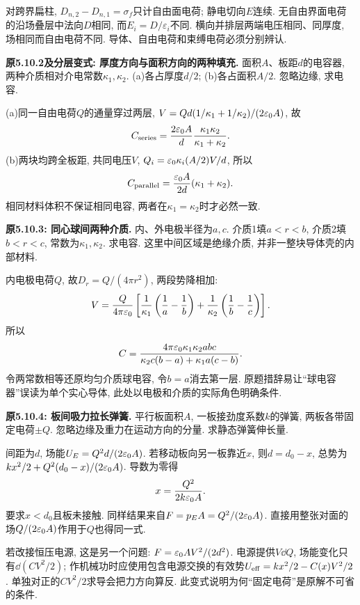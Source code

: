 对跨界扁柱, $D_{n,2}-D_{n,1}=\sigma_f$只计自由面电荷; 静电切向$E$连续. 无自由界面电荷的沿场叠层中法向$D$相同, 而$E_i=D/\varepsilon_i$不同. 横向并排层两端电压相同、同厚度, 场相同而自由电荷不同. 导体、自由电荷和束缚电荷必须分别辨认.

\begin{example}
\textbf{原5.10.2及分层变式: 厚度方向与面积方向的两种填充.} 
面积$A$、板距$d$的电容器, 两种介质相对介电常数$\kappa_1,\kappa_2$. (a)各占厚度$d/2$; (b)各占面积$A/2$. 忽略边缘, 求电容.
\end{example}
\begin{solution}
(a)同一自由电荷$Q$的通量穿过两层, $V=Qd(1/\kappa_1+1/\kappa_2)/(2\varepsilon_0 A)$, 故
\[C_{\rm series}=\frac{2\varepsilon_0 A}{d}\frac{\kappa_1\kappa_2}{\kappa_1+\kappa_2}.\]
(b)两块均跨全板距, 共同电压$V$, $Q_i=\varepsilon_0\kappa_i(A/2)V/d$, 所以
\[C_{\rm parallel}=\frac{\varepsilon_0 A}{2d}(\kappa_1+\kappa_2).\]
相同材料体积不保证相同电容, 两者在$\kappa_1=\kappa_2$时才必然一致.
\end{solution}

\begin{example}
\textbf{原5.10.3: 同心球间两种介质.} 
内、外电极半径为$a,c$. 介质1填$a<r<b$, 介质2填$b<r<c$, 常数为$\kappa_1,\kappa_2$. 求电容. 这里中间区域是绝缘介质, 并非一整块导体壳的内部材料.
\end{example}
\begin{solution}
内电极电荷$Q$, 故$D_r=Q/(4\pi r^2)$, 两段势降相加:
\[V=\frac Q{4\pi\varepsilon_0}\left[\frac1{\kappa_1}\left(\frac1a-\frac1b\right)+\frac1{\kappa_2}\left(\frac1b-\frac1c\right)\right].\]
所以
\[C=\frac{4\pi\varepsilon_0\kappa_1\kappa_2abc}{\kappa_2c(b-a)+\kappa_1a(c-b)}.\]
令两常数相等还原均匀介质球电容, 令$b=a$消去第一层. 原题措辞易让“球电容器”误读为单个实心导体, 此处以电极和介质的实际角色明确条件.
\end{solution}

\label{tb:cap-force}
\begin{example}
\textbf{原5.10.4: 板间吸力拉长弹簧.} 
平行板面积$A$, 一板接劲度系数$k$的弹簧, 两板各带固定电荷$\pm Q$. 忽略边缘及重力在运动方向的分量. 求静态弹簧伸长量.
\end{example}
\begin{solution}
间距为$d$, 场能$U_E=Q^2d/(2\varepsilon_0 A)$. 若移动板向另一板靠近$x$, 则$d=d_0-x$, 总势为$k x^2/2+Q^2(d_0-x)/(2\varepsilon_0 A)$. 导数为零得
\[x=\frac{Q^2}{2k\varepsilon_0 A}.\]
要求$x<d_0$且板未接触. 同样结果来自$F=p_EA=Q^2/(2\varepsilon_0 A)$. 直接用整张对面的场$Q/(2\varepsilon_0 A)$作用于$Q$也得同一式.

若改接恒压电源, 这是另一个问题: $F=\varepsilon_0 A V^2/(2d^2)$. 电源提供$V\dd Q$, 场能变化只有$\dd(CV^2/2)$; 作机械功时应使用包含电源交换的有效势$U_{\rm eff}=kx^2/2-C(x)V^2/2$. 单独对正的$CV^2/2$求导会把力方向算反. 此变式说明为何“固定电荷”是原解不可省的条件.
\end{solution}

